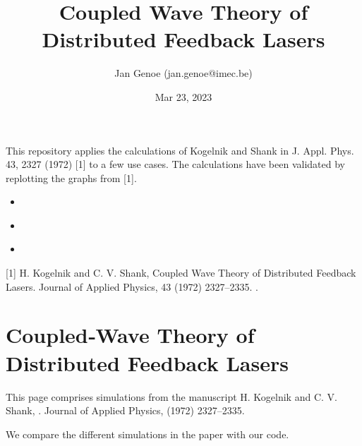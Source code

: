 \documentclass[a4paper,10pt,english,openany,oneside]{jupyterBook}
\title{Coupled Wave Theory of Distributed Feedback Lasers}
\date{Mar 23, 2023}
\author{Jan Genoe (jan.genoe@imec.be)}
\begin{document}
\pagestyle{empty}
\sphinxmaketitle
\pagestyle{plain}
\sphinxtableofcontents
\pagestyle{normal}
\label{\detokenize{intro::doc}}


\sphinxAtStartPar
This repository applies the calculations of Kogelnik and Shank in J. Appl. Phys. 43, 2327 (1972) {[}1{]} to a few use cases.
The calculations have been validated by replotting the graphs from {[}1{]}.

\begin{DUlineblock}{0em}
\item[] 
\end{DUlineblock}
\begin{itemize}
\item {} 
\sphinxAtStartPar
{\hyperref[\detokenize{Kogelnik-Shank_Coupled-Wave-Theory_DFB-Lasers::doc}]{}}

\item {} 
\sphinxAtStartPar
{\hyperref[\detokenize{NanoimprintedDFB::doc}]{}}

\item {} 
\sphinxAtStartPar
{\hyperref[\detokenize{bib::doc}]{}}

\end{itemize}

\sphinxAtStartPar
{[}1{]} H. Kogelnik and C. V. Shank, Coupled Wave Theory of Distributed Feedback Lasers. Journal of Applied Physics, 43 (1972) 2327–2335. .

\sphinxstepscope


\chapter{Coupled‐Wave Theory of Distributed Feedback Lasers}
\label{\detokenize{Kogelnik-Shank_Coupled-Wave-Theory_DFB-Lasers:coupledwave-theory-of-distributed-feedback-lasers}}\label{\detokenize{Kogelnik-Shank_Coupled-Wave-Theory_DFB-Lasers::doc}}
\sphinxAtStartPar
This page comprises simulations from the manuscript H. Kogelnik and C. V. Shank, . Journal of Applied Physics,  (1972) 2327–2335. 

\sphinxAtStartPar
We compare the different simulations in the paper with our code.
\end{document}
